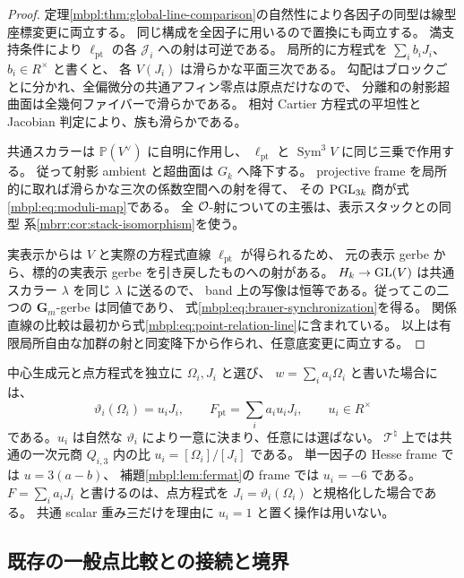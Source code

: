 \begin{proof}
定理\ref{mbpl:thm:global-line-comparison}の自然性により各因子の同型は線型座標変更に両立する。
同じ構成を全因子に用いるので置換にも両立する。
満支持条件により $\ell_{\mathrm{pt}}$ の各 $\mathcal J_i$ への射は可逆である。
局所的に方程式を $\sum_i b_iJ_i$、$b_i\in R^\times$ と書くと、
各 $V(J_i)$ は滑らかな平面三次である。
勾配はブロックごとに分かれ、全偏微分の共通アフィン零点は原点だけなので、
分離和の射影超曲面は全幾何ファイバーで滑らかである。
相対 Cartier 方程式の平坦性と Jacobian 判定により、族も滑らかである。

共通スカラーは $\mathbb P(V^\vee)$ に自明に作用し、
$\ell_{\mathrm{pt}}$ と $\operatorname{Sym}^3V$ に同じ三乗で作用する。
従って射影 ambient と超曲面は $G_k$ へ降下する。
projective frame を局所的に取れば滑らかな三次の係数空間への射を得て、
その $\operatorname{PGL}_{3k}$ 商が式\eqref{mbpl:eq:moduli-map}である。
全 $\mathcal O$-射についての主張は、表示スタックとの同型
系\ref{mbrr:cor:stack-isomorphism}を使う。

実表示からは $V$ と実際の方程式直線 $\ell_{\mathrm{pt}}$ が得られるため、
元の表示 gerbe から、標的の実表示 gerbe を引き戻したものへの射がある。
$H_k\to\operatorname{GL}(V)$ は共通スカラー $\lambda$ を同じ $\lambda$ に送るので、
band 上の写像は恒等である。従ってこの二つの $\mathbf G_m$-gerbe は同値であり、
式\eqref{mbpl:eq:brauer-synchronization}を得る。
関係直線の比較は最初から式\eqref{mbpl:eq:point-relation-line}に含まれている。
以上は有限局所自由な加群の射と同変降下から作られ、任意底変更に両立する。
\end{proof}

\begin{remark}[局所方程式の係数を省略しない]
\label{mbpl:rem:scale}
中心生成元と点方程式を独立に $\Omega_i,J_i$ と選び、
$w=\sum_i a_i\Omega_i$ と書いた場合には、
\[
 \vartheta_i(\Omega_i)=u_iJ_i,
 \qquad
 F_{\mathrm{pt}}=\sum_i a_iu_iJ_i,
 \qquad
 u_i\in R^\times
\]
である。$u_i$ は自然な $\vartheta_i$ により一意に決まり、任意には選ばない。
$\mathcal T^\natural$ 上では共通の一次元商 $Q_{i,3}$ 内の比
$u_i=[\Omega_i]/[J_i]$ である。
単一因子の Hesse frame では $u=3(a-b)$、
補題\ref{mbpl:lem:fermat}の frame では $u_i=-6$ である。
$F=\sum_i a_iJ_i$ と書けるのは、点方程式を
$J_i=\vartheta_i(\Omega_i)$ と規格化した場合である。
共通 scalar 重み三だけを理由に $u_i=1$ と置く操作は用いない。
\end{remark}

\subsection{既存の一般点比較との接続と境界}

